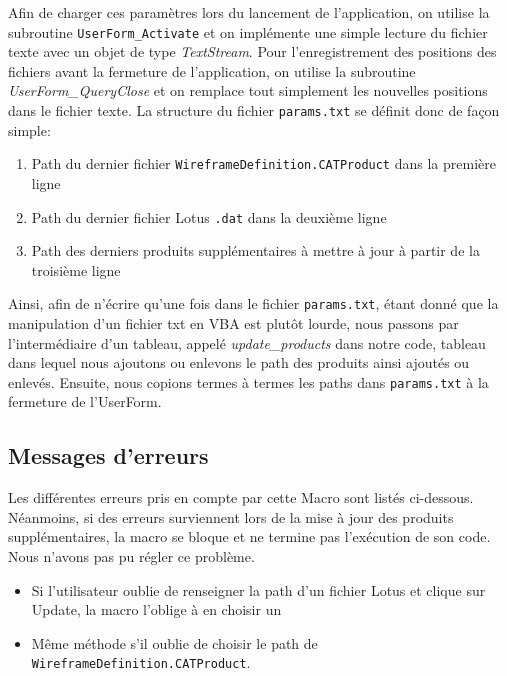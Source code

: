 \par Afin de charger ces paramètres lors du lancement de l'application, on utilise la subroutine \texttt{UserForm\_Activate} et on implémente une simple lecture du fichier texte  avec un objet de type \textit{TextStream}. Pour l'enregistrement des positions des fichiers avant la fermeture de l'application, on utilise la subroutine \textit{UserForm\_QueryClose} et on remplace tout simplement les nouvelles positions dans le fichier texte. La structure du fichier \texttt{params.txt} se définit donc de façon simple:
\begin{enumerate}
    \item Path du dernier fichier \texttt{WireframeDefinition.CATProduct} dans la première ligne
    \item Path du dernier fichier Lotus \texttt{.dat} dans la deuxième ligne
    \item Path des derniers produits supplémentaires à mettre à jour à partir de la troisième ligne
\end{enumerate}

\par Ainsi, afin de n'écrire qu'une fois dans le fichier \texttt{params.txt}, étant donné que la manipulation d'un fichier txt en VBA est plutôt lourde, nous passons par l'intermédiaire d'un tableau, appelé \textit{update\_products} dans notre code,  tableau dans lequel nous ajoutons ou enlevons le path des produits ainsi ajoutés ou enlevés. Ensuite, nous copions termes à termes les paths dans \texttt{params.txt} à la fermeture de l'UserForm.

\subsection{Messages d'erreurs} %

\par Les différentes erreurs pris en compte par cette Macro sont listés ci-dessous. Néanmoins, si des erreurs surviennent lors de la  mise à jour des produits supplémentaires, la macro se bloque et ne termine pas l'exécution de son code. Nous n'avons pas pu régler ce problème.

\begin{itemize}
    \item Si l'utilisateur oublie de renseigner la path d'un fichier Lotus et clique sur Update, la macro l'oblige à en choisir un
    \item Même méthode s'il oublie de choisir le path de \texttt{WireframeDefinition.CATProduct}.
\end{itemize}
